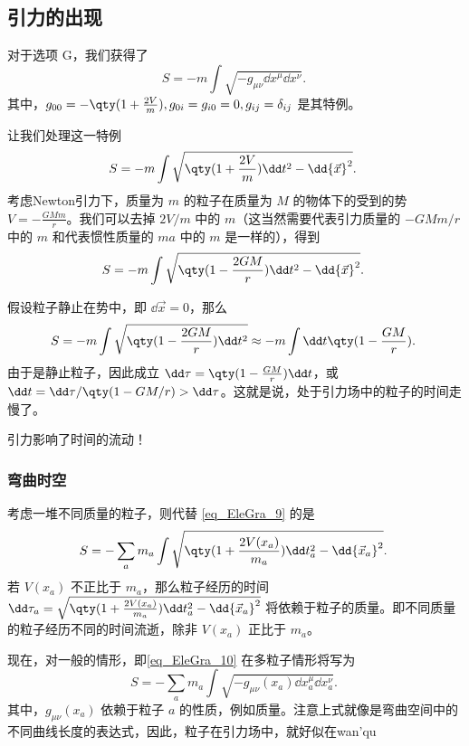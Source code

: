 \subsection{引力的出现}
对于选项 G，我们获得了
\begin{equation}\label{eq_EleGra_10}
S=-m\int\sqrt{-g_{\mu\nu}\dd x^\mu\dd x^\nu}.~
\end{equation}
其中，$g_{00}=-\qty(1+\frac{2V}{m}),g_{0i}=g_{i0}=0,g_{ij}=\delta_{ij}$ 是其特例。

让我们处理这一特例
\begin{equation}\label{eq_EleGra_9}
S=-m\int\sqrt{\qty(1+\frac{2V}{m})\dd t^2-\dd {\vec x}^2}.~
\end{equation}
考虑Newton引力下，质量为 $m$ 的粒子在质量为 $M$ 的物体下的受到的势 $V=-\frac{GMm}{r}$。我们可以去掉 $2V/m$ 中的 $m$（这当然需要代表引力质量的 $-GMm/r$ 中的 $m$ 和代表惯性质量的 $ma$ 中的 $m$ 是一样的），得到
\begin{equation}
S=-m\int\sqrt{\qty(1-\frac{2GM}{r})\dd t^2-\dd {\vec x}^2}.~
\end{equation}

假设粒子静止在势中，即 $\dd {\vec x}=0$，那么
\begin{equation}
S=-m\int\sqrt{\qty(1-\frac{2GM}{r})\dd t^2}\approx-m\int\dd t\qty(1-\frac{GM}{r}).~
\end{equation}
由于是静止粒子，因此成立 $\dd\tau=\qty(1-\frac{GM}{r})\dd t$，或 $\dd t=\dd \tau/\qty(1-GM/r)>\dd\tau$。这就是说，处于引力场中的粒子的时间走慢了。

引力影响了时间的流动！

\subsubsection{弯曲时空}
考虑一堆不同质量的粒子，则代替 \autoref{eq_EleGra_9} 的是
\begin{equation}
S=-\sum_a m_a\int\sqrt{\qty(1+\frac{2V(x_a)}{m_a})\dd t_a^2-\dd {\vec x_a}^2}.~
\end{equation}
若 $V(x_a)$ 不正比于 $m_a$，那么粒子经历的时间 $\dd \tau_a=\sqrt{\qty(1+\frac{2V(x_a)}{m_a})\dd t_a^2-\dd {\vec x_a}^2}$ 将依赖于粒子的质量。即不同质量的粒子经历不同的时间流逝，除非 $V(x_a)$ 正比于 $m_a$。

现在，对一般的情形，即\autoref{eq_EleGra_10} 在多粒子情形将写为
\begin{equation}
S=-\sum_a m_a\int\sqrt{-g_{\mu\nu}(x_a)\dd x_a^\mu\dd x_a^\nu}.~
\end{equation}
其中，$g_{\mu\nu}(x_a)$ 依赖于粒子 $a$ 的性质，例如质量。注意上式就像是弯曲空间中的不同曲线长度的表达式，因此，粒子在引力场中，就好似在wan'qu











